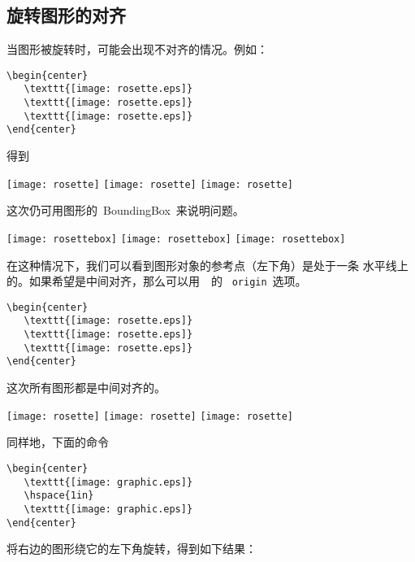 \subsection{旋转图形的对齐}\label{ssec:ralign}

当图形被旋转时，可能会出现不对齐的情况。例如：

\begin{Verbatim}[xleftmargin=1cm]
\begin{center}
   \texttt{[image: rosette.eps]}
   \texttt{[image: rosette.eps]}
   \texttt{[image: rosette.eps]}
\end{center}
\end{Verbatim}
得到

\begin{center}
   \texttt{[image: rosette]}
   \texttt{[image: rosette]}
   \texttt{[image: rosette]}
\end{center}
这次仍可用图形的~BoundingBox~来说明问题。

\begin{center}
   \texttt{[image: rosettebox]}
   \texttt{[image: rosettebox]}
   \texttt{[image: rosettebox]}
\end{center}
在这种情况下，我们可以看到图形对象的参考点（左下角）是处于一条
水平线上的。如果希望是中间对齐，那么可以用~~的
~\texttt{origin}~选项。

\begin{Verbatim}
\begin{center}
   \texttt{[image: rosette.eps]}
   \texttt{[image: rosette.eps]}
   \texttt{[image: rosette.eps]}
\end{center}
\end{Verbatim}
这次所有图形都是中间对齐的。

\begin{center}
   \texttt{[image: rosette]}
   \texttt{[image: rosette]}
   \texttt{[image: rosette]}
\end{center}
同样地，下面的命令

\begin{Verbatim}[xleftmargin=1cm]
\begin{center}
   \texttt{[image: graphic.eps]}
   \hspace{1in}
   \texttt{[image: graphic.eps]}
\end{center}
\end{Verbatim}
将右边的图形绕它的左下角旋转，得到如下结果：

